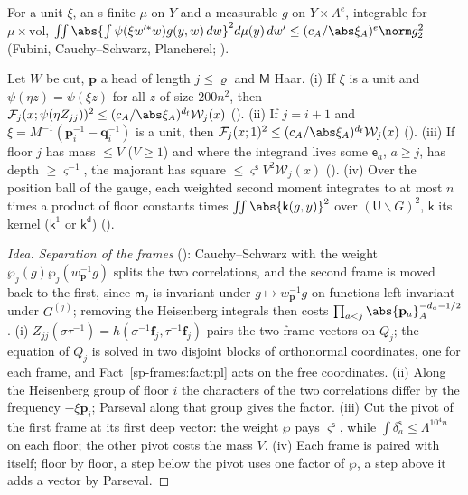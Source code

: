\begin{fact}\label{sp-frames:fact:pl}
For a unit $\xi$, an s-finite $\mu$ on $Y$ and a measurable $g$ on $Y\times A^e$, integrable for
$\mu\times\mathrm{vol}$, $\iint\abs{\int\psi(\xi w'^*w)g(y,w)\,dw}^2d\mu(y)\,dw'\le(c_A/\abs\xi_A)^e\norm g_2^2$
(Fubini, Cauchy--Schwarz, Plancherel; ).
\end{fact}

\begin{proposition}[Gains]\label{sp-frames:prop:gains}
Let $W$ be cut, $\mathbf p$ a head of length $j\le\varrho$ and $\mathsf M$ Haar.
(i) If $\xi$ is a unit and $\psi(\eta z)=\psi(\xi z)$ for all $z$ of size $200n^2$, then
$\mathcal F_j(x;\psi(\eta Z_{jj}))^2\le(c_A/\abs\xi_A)^{d_{\mathrm f}}\mathcal W_j(x)$
(). (ii) If $j=i+1$ and
$\xi=M^{-1}(\mathbf p_i^{-1}-\mathbf q_i^{-1})$ is a unit, then $\mathcal F_j(x;1)^2\le(c_A/\abs\xi_A)^{d_{\mathrm f}}
\mathcal W_j(x)$ (). (iii) If floor $j$
has mass $\le V$ ($V\ge1$) and where the integrand lives some $\mathsf e_a$, $a\ge j$, has depth
$\ge\varsigma^{-1}$, the majorant has square $\le\varsigma^{\mathsf s}V^2\mathcal W_j(x)$
(). (iv) Over the position ball of the
gauge, each weighted second moment integrates to at most $n$ times a product of floor constants
times $\iint\abs{\mathsf k(g,y)}^2$ over $(\mathsf U\backslash G)^2$, $\mathsf k$ its kernel ($\mathsf k^1$ or $\mathsf k^{\mathsf d}$)
().
\end{proposition}

\begin{proof}[Idea]
\emph{Separation of the frames} ():
Cauchy--Schwarz with the weight $\wp_j(g)\wp_j(w_{\mathbf p}^{-1}g)$ splits the two correlations, and the
second frame is moved back to the first, since $\mathsf m_j$ is invariant under $g\mapsto w_{\mathbf p}^{-1}g$
on functions left invariant under $G^{(j)}$; removing the Heisenberg integrals then costs
$\prod_{a<j}\abs{\mathbf p_a}_A^{-d_a-1/2}$. (i)
$Z_{jj}(\sigma\tau^{-1})=h(\sigma^{-1}\mathbf f_j,\tau^{-1}\mathbf f_j)$ pairs the two frame vectors on $Q_j$; the
equation of $Q_j$ is solved in two disjoint blocks of orthonormal coordinates, one for each frame,
and Fact~\ref{sp-frames:fact:pl} acts on the free coordinates. (ii) Along the Heisenberg group of
floor $i$ the characters of the two correlations differ by the frequency $-\xi\mathbf p_i$; Parseval along
that group gives the factor. (iii) Cut the pivot of the first frame at its first deep vector: the weight
$\wp$ pays $\varsigma^{\mathsf s}$, while $\int\delta_a^{\mathsf s}\le\Lambda^{10^4n}$ on each floor; the
other pivot costs the mass $V$. (iv) Each frame is paired with itself; floor by
floor, a step below the pivot uses one factor of $\wp$, a step above it adds a vector by Parseval.
\end{proof}

